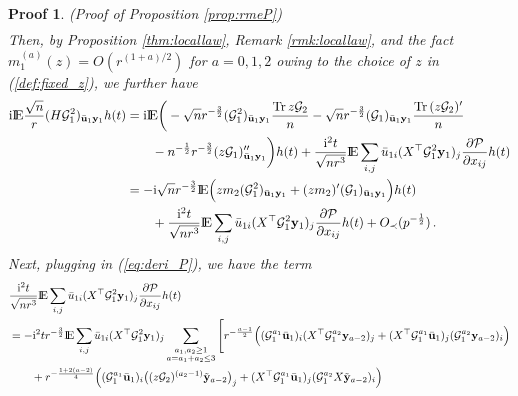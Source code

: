 \documentclass[12pt]{article}
\numberwithin{equation}{section}
\newtheorem{myPro}{Proof}
\theoremstyle{remark}
\newcommand{\1}{{\rm 1}\kern-0.24em{\rm I}}
\newcommand{\E}{{\rm I}\kern-0.18em{\rm E}}
\begin{document}
\begin{appendices}
\begin{myPro}{(Proof of Proposition  \ref{prop:rmeP})}
\begin{align*}
 \end{align*}
 Then, by  Proposition \ref{thm:locallaw}, Remark \ref{rmk:locallaw}, and the fact $m_1^{(a)}(z)= O(r^{(1+a)/2})$ for $a=0,1,2$ owing to the choice of $z$ in  (\ref{def:fixed_z}), we further have
 \begin{align}\label{2020100702}
  \mathrm{i}\E\frac{\sqrt n}{r} ({H}\mathcal{G}_1^2)_{\bar{\bf u}_1{\bf y}_1}h(t) &=\mathrm{i}  \E \bigg( - \sqrt n  r^{-\frac 32}(\mathcal{G}_1^2)_{\bar{\bf u}_1{\bf y}_1} \frac{{\rm Tr} \,z \mathcal{G}_2}{n} - \sqrt n r^{-\frac 32} (\mathcal{G}_1)_{\bar{\bf u}_1{\bf y}_1} \frac{{\rm Tr} \, (z \mathcal{G}_2)'}{n} \notag\\
  &\qquad - n^{-\frac 12} r^{-\frac 32} (z\mathcal{G}_1)''_{\bar{\bf u}_1{\bf y}_1} \bigg)h(t) +  \frac{\mathrm{i}^2t}{\sqrt {nr^3}}\E\sum_{i,j} \bar{u}_{1i}  ({X}^{\top}\mathcal{G}_1^2{\bf y}_1)_j \frac{\partial \mathcal{P}}{\partial x_{ij}} h(t) \notag\\
  &= -\mathrm{i}\sqrt n r^{-\frac 32}  \E \Big( zm_2 (\mathcal{G}_1^2)_{\bar{\bf u}_1{\bf y}_1}  + (zm_2 )'(\mathcal{G}_1)_{\bar{\bf u}_1{\bf y}_1}  \Big) h(t)\notag\\
  & \qquad +  \frac{\mathrm{i}^2t}{\sqrt {nr^3}}\E\sum_{i,j} \bar{u}_{1i}  ({X}^{\top}\mathcal{G}_1^2{\bf y}_1)_j \frac{\partial \mathcal{P}}{\partial x_{ij}} h(t)+ O_\prec(p^{-\frac 12})\,.
 \end{align}
 Next, plugging in (\ref{eq:deri_P}),   we have the term {\small
 \begin{align} \label{2020100701}
& \frac{\mathrm{i}^2 t}{\sqrt {nr^3}}\E\sum_{i,j} \bar{u}_{1i}  ({X}^{\top}\mathcal{G}_1^2{\bf y}_1)_j \frac{\partial \mathcal{P}}{\partial x_{ij}}  h(t)\notag\\
 & =
   -\mathrm{i}^2t r^{-\frac 32}\E\sum_{i,j} \bar{u}_{1i}({X}^{\top}\mathcal{G}_1^2{\bf y}_1)_j\sum_{\begin{subarray}{c} a_1, a_2\geq 1\\a= a_1+a_2\leq 3\end{subarray}} \Bigg[
   r^{-\frac{a-1}{2}}\Big((\mathcal{G}_1^{a_1}\bar{\bf u}_1)_{i} ({X}^{\top}\mathcal{G}_1 ^{a_2}{\bf y}_{a-2})_j +  ({X}^{\top}\mathcal{G}_1^{a_1}\bar{\bf u}_1)_{j} (\mathcal{G}_1^{a_2} {\bf y}_{a-2})_i  \Big) \notag\\
   & \qquad +
    r^{-\frac{1+2(a-2)}{4}}\Big((\mathcal{G}_1^{a_1}\bar{\bf u}_1)_{i} \big((z\mathcal{G}_2 )^{(a_2-1)}\tilde{\bf y}_{a-2}\big)_j +  ({X}^{\top}\mathcal{G}_1^{a_1}\bar{\bf u}_1)_{j} (\mathcal{G}_1^{a_2} {X}\tilde{\bf y}_{a-2})_i  \Big)  \notag\\

\end{align}}
\end{myPro}
\end{appendices}
\end{document}
